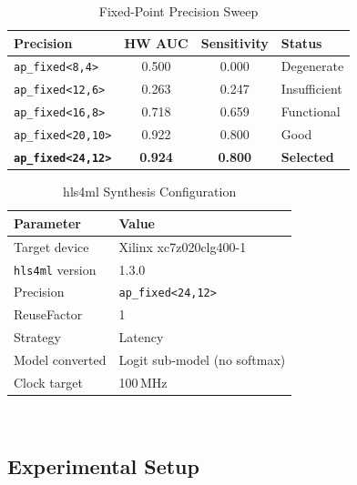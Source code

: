 \documentclass[12pt, letterpaper]{article}
\begin{document}
\begin{table}[!ht]
  \centering
  \caption{Fixed-Point Precision Sweep}
  \label{tab:precision}
  \small
  \begin{tabular}{lccl}
    \toprule
    \textbf{Precision} & \textbf{HW AUC} &
    \textbf{Sensitivity} & \textbf{Status} \\
    \midrule
    \texttt{ap\_fixed<8,4>}   & 0.500 & 0.000 & Degenerate \\
    \texttt{ap\_fixed<12,6>}  & 0.263 & 0.247 & Insufficient \\
    \texttt{ap\_fixed<16,8>}  & 0.718 & 0.659 & Functional \\
    \texttt{ap\_fixed<20,10>} & 0.922 & 0.800 & Good \\
    \textbf{\texttt{ap\_fixed<24,12>}}
        
                      & \textbf{0.924} & \textbf{0.800}
                              & \textbf{Selected} \\
    \bottomrule
  \end{tabular}
\end{table}

\begin{table}[!ht]
  \centering
  \caption{hls4ml Synthesis Configuration}
  \label{tab:fpga_cfg}
  \begin{tabular}{ll}
    \toprule
    \textbf{Parameter} & \textbf{Value} \\
    \midrule
    Target device       
  & Xilinx xc7z020clg400-1 \\
    \texttt{hls4ml} version & 1.3.0 \\
    Precision             & \texttt{ap\_fixed<24,12>} \\
    ReuseFactor           & 1 \\
    Strategy              & Latency \\
    Model converted       & Logit sub-model (no softmax) \\
    Clock target         
 & 100\,MHz \\
    \bottomrule
  \end{tabular}
\end{table} 
 \\
\subsection{Experimental Setup}
\label{sec:setup}
\end{document}
